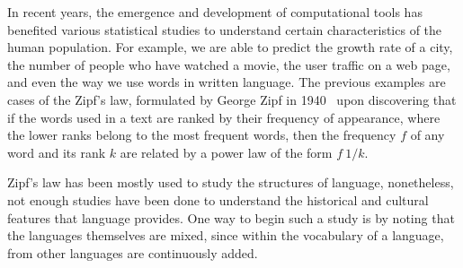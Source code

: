\documentclass[10pt,letterpaper]{article} %
\begin{document}
	In recent years, the emergence and development of computational tools has
	benefited various statistical studies to understand certain characteristics of
	the human population. For example, we are able to predict the growth rate of a
	city, the number of people who have watched a movie, the user traffic on a web
	page, and even the way we use words in written language. The previous examples
	are cases of the Zipf's law, formulated by George Zipf in 1940~\cite{Zipf} upon
	discovering that if  the words used in a text are ranked by their frequency of
	appearance, where the lower ranks belong to the most frequent words,  then the
	frequency  $f$  of any word and its rank  $k$ are related by a power law of the
	form $f~1/k$.
	
	
	
	
	
	Zipf's law has been mostly used to study the structures of language,
	nonetheless, not enough studies have been done to understand the historical and
	cultural features that language provides. One way to begin such a study is by
	noting that the languages themselves are mixed, since within the vocabulary of
	a language, from other languages are continuously added.
	
	
\end{document}
